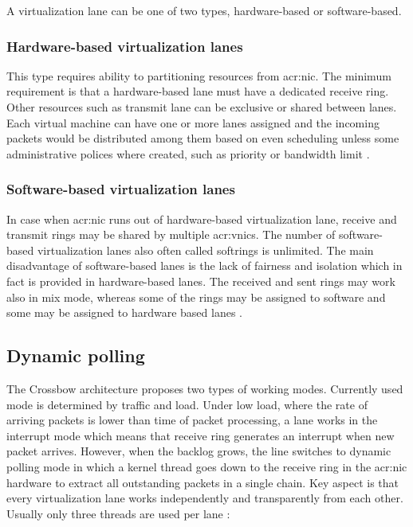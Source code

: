 \documentclass[11pt,openany]{book}
\begin{document}
        A virtualization lane can be one of two types, hardware-based or software-based.

        
        \subsubsection{Hardware-based virtualization lanes}
        
          This type requires ability to partitioning resources from \gls{acr:nic}. The minimum requirement is that a
          hardware-based lane must have a dedicated receive ring. Other resources such as transmit lane can be exclusive
          or shared between lanes. Each virtual machine can have one or more lanes assigned and the incoming packets
          would be distributed among them based on even scheduling unless some administrative polices where created,
          such as priority or bandwidth limit \cite{crossbow}.		

        
        \subsubsection{Software-based virtualization lanes}
        
          In case when \gls{acr:nic} runs out of hardware-based virtualization lane, receive and transmit rings may be
          shared by multiple \gls{acr:vnic}s. The number of software-based virtualization lanes also often called
          softrings is unlimited. The main disadvantage of software-based lanes is the lack of fairness and isolation
          which in fact is provided in hardware-based lanes. The received and sent rings may work also in mix mode,
          whereas some of the rings may be assigned to software and some may be assigned to hardware based lanes
          \cite{crossbow}.	

			
      \subsection{Dynamic polling}	
        
        The Crossbow architecture proposes two types of working modes. Currently used mode is determined by traffic and
        load. Under low load, where the rate of arriving packets is lower than time of packet processing, a lane works
        in the interrupt mode which means that receive ring generates an interrupt when new packet arrives. However,
        when the backlog grows, the line switches to dynamic polling mode in which a kernel thread goes down to the
        receive ring in the \gls{acr:nic} hardware to extract all outstanding packets in a single chain. Key aspect is
        that every virtualization lane works independently and transparently from each other. Usually only three threads
        are used per lane \cite{crossbow}:
        
\end{document}
